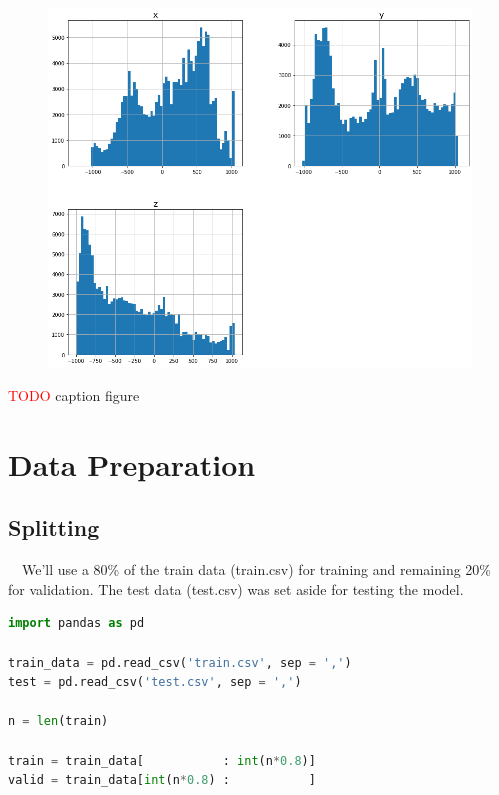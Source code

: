 \begin{figure}[H]
\centering
  \includegraphics[scale=0.4]{img/task_1/histograms.png}
  \caption{}
  \label{fig: }
\end{figure}

\textcolor{red}{TODO} caption figure





\section*{Data Preparation}\label{Data Preparation}

\subsection*{Splitting}\label{Splitting}

~~We'll use a 80\% of the train data (train.csv) for training and remaining 20\% for validation. The test data (test.csv) was set aside for testing the model.

\begin{lstlisting}[language=Python]
import pandas as pd

train_data = pd.read_csv('train.csv', sep = ',')
test = pd.read_csv('test.csv', sep = ',')

n = len(train)

train = train_data[           : int(n*0.8)]
valid = train_data[int(n*0.8) :           ]
\end{lstlisting}

